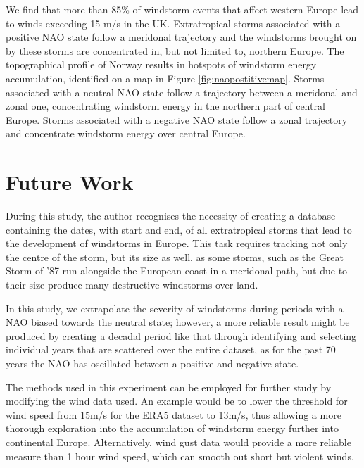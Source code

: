      We find that more than 85\% of windstorm events that affect western Europe lead to winds exceeding 15 m/s in the UK. Extratropical storms associated with a positive NAO state follow a meridonal trajectory and the windstorms brought on by these storms are concentrated in, but not limited to, northern Europe. The topographical profile of Norway results in hotspots of windstorm energy accumulation, identified on a map in Figure \ref{fig:naopostitivemap}. Storms associated with a neutral NAO state follow a trajectory between a meridonal and zonal one, concentrating windstorm energy in the northern part of central Europe. Storms associated with a negative NAO state follow a zonal trajectory and concentrate windstorm energy over central Europe.

\section{Future Work}

    During this study, the author recognises the necessity of creating a database containing the dates, with start and end, of all extratropical storms that lead to the development of windstorms in Europe. This task requires tracking not only the centre of the storm, but its size as well, as some storms, such as the Great Storm of '87 run alongside the European coast in a meridonal path, but due to their size produce many destructive windstorms over land.

    In this study, we extrapolate the severity of windstorms during periods with a NAO biased towards the neutral state; however, a more reliable result might be produced by creating a decadal period like that through identifying and selecting individual years that are scattered over the entire dataset, as for the past 70 years the NAO has oscillated between a positive and negative state.

    The methods used in this experiment can be employed for further study by modifying the wind data used. An example would be to lower the threshold for wind speed from 15m/s for the ERA5 dataset to 13m/s, thus allowing a more thorough exploration into the accumulation of windstorm energy further into continental Europe. Alternatively, wind gust data would provide a more reliable measure than 1 hour wind speed, which can smooth out short but violent winds.
